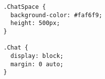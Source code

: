 \begin{verbatim}
.ChatSpace {
  background-color: #faf6f9;
  height: 500px;
}

.Chat {
  display: block;
  margin: 0 auto;
}

\end{verbatim}